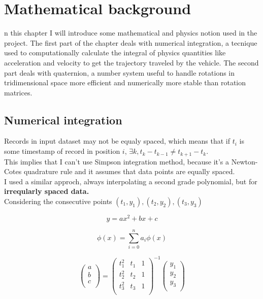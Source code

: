 \chapter{Mathematical background}
\label{chap:math_background}

n this chapter I will introduce some mathematical and physics notion used in the project.
The first part of the chapter deals with numerical integration, a tecnique used to computationally calculate the integral of physics quantities like acceleration and velocity to get the trajectory traveled by the vehicle.
The second part deals with quaternion, a number system useful to handle rotations in tridimensional space more efficient and numerically more stable than rotation matrices.

\section{Numerical integration}
Records in input dataset may not be equaly spaced, which means that if $t_i$ is some timestamp of record in position $i$, $\exists k, t_{k}-t_{k-1}\neq t_{k+1}-t_k$. \\
This implies that I can't use Simpson integration method, because it's a Newton-Cotes quadrature rule and it assumes that data points are equally spaced.  \\
I used a similar approch, always interpolating a second grade polynomial, but for \textbf{irreqularly spaced data.} \cite{integrating-irregularly} \\
Considering the consecutive points $(t_1,y_1),(t_2,y_2),(t_3,y_3)$

$$y=ax^2+bx+c$$

$$ \phi(x) = \sum_{i=0}^n a_i \phi (x)$$ 

$$ 
\begin{pmatrix}
a \\
b \\
c \\
\end{pmatrix}
=
\begin{pmatrix}
t_1^2 & t_1 & 1 \\
t_2^2 & t_2 & 1 \\
t_3^2 & t_3 & 1 \\
\end{pmatrix}^{-1}
\begin{pmatrix}
y_1 \\
y_2 \\
y_3 \\
\end{pmatrix}
$$

